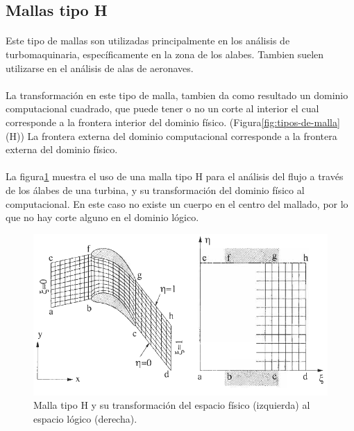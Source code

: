 \documentclass[letterpaper, openright, 12pt]{book}
\begin{document}
    \subsection{Mallas tipo H}
    \paragraph*{}
        Este tipo de mallas son utilizadas principalmente en los análisis de
        turbomaquinaria, específicamente en la zona de los alabes.\cite{blazek}\cite{best-practices-grid-generation}
        Tambien suelen utilizarse en el análisis de alas de aeronaves.\cite{vladimir-grid}
    \paragraph*{}
        La transformación en este tipo de malla, tambien da como resultado un
        dominio computacional cuadrado, que puede tener o no un corte al
        interior el cual corresponde a la frontera interior del dominio físico.
        (Figura\ref*{fig:tipos-de-malla} (H)) La frontera externa del dominio
        computacional corresponde a la frontera externa del dominio físico.

    \paragraph*{}
        La figura\ref{fig:malla-h} muestra el uso de una malla tipo H para el
        análisis del flujo a través de los álabes de una turbina, y su
        transformación del dominio físico al computacional. En este caso no
        existe un cuerpo en el centro del mallado, por lo que no hay corte
        alguno en el dominio lógico.
            \begin{figure}[htbp!]
                \centering
                \includegraphics[keepaspectratio, width=170mm]{./Imagenes/malla-h}
                \captionsetup{justification=centering, margin=2cm}
                \caption[Malla tipo O]{Malla tipo H y su transformación del
                    espacio físico (izquierda) al espacio lógico (derecha).
                    \cite{blazek}}
            \label{fig:malla-h}
            \end{figure}
\end{document}
